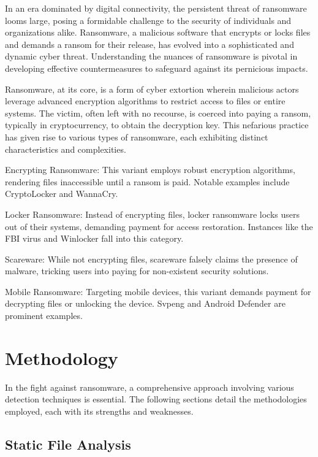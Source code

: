 \documentclass[12pt,twocolumn]{article}
\begin{document}
    In an era dominated by digital connectivity, the persistent threat of ransomware looms large, posing a formidable challenge to the security of individuals and organizations alike. Ransomware, a malicious software that encrypts or locks files and demands a ransom for their release, has evolved into a sophisticated and dynamic cyber threat. Understanding the nuances of ransomware is pivotal in developing effective countermeasures to safeguard against its pernicious impacts.

    Ransomware, at its core, is a form of cyber extortion wherein malicious actors leverage advanced encryption algorithms to restrict access to files or entire systems. The victim, often left with no recourse, is coerced into paying a ransom, typically in cryptocurrency, to obtain the decryption key. This nefarious practice has given rise to various types of ransomware, each exhibiting distinct characteristics and complexities.
    
    {Encrypting Ransomware:} This variant employs robust encryption algorithms, rendering files inaccessible until a ransom is paid. Notable examples include CryptoLocker and WannaCry.

    {Locker Ransomware:} Instead of encrypting files, locker ransomware locks users out of their systems, demanding payment for access restoration. Instances like the FBI virus and Winlocker fall into this category.

    {Scareware:} While not encrypting files, scareware falsely claims the presence of malware, tricking users into paying for non-existent security solutions.

    {Mobile Ransomware:} Targeting mobile devices, this variant demands payment for decrypting files or unlocking the device. Svpeng and Android Defender are prominent examples.

\section{Methodology}

In the fight against ransomware, a comprehensive approach involving various detection techniques is essential. The following sections detail the methodologies employed, each with its strengths and weaknesses.

\subsection{Static File Analysis}
\end{document}
